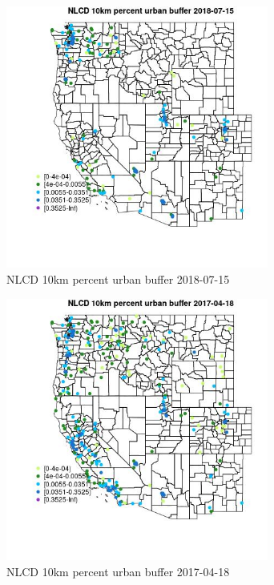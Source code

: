 \begin{figure} 
\centering  
\includegraphics[width=0.77\textwidth]{Code_Outputs/Report_ML_input_PM25_Step4_part_e_de_duplicated_aves_compiled_2019-05-21wNAs_MapObsNLCD_10km_percent_urban_buffer2018-07-15.jpg} 
\caption{\label{fig:Report_ML_input_PM25_Step4_part_e_de_duplicated_aves_compiled_2019-05-21wNAsMapObsNLCD_10km_percent_urban_buffer2018-07-15}NLCD 10km percent urban buffer 2018-07-15} 
\end{figure} 
 

\clearpage 

\begin{figure} 
\centering  
\includegraphics[width=0.77\textwidth]{Code_Outputs/Report_ML_input_PM25_Step4_part_e_de_duplicated_aves_compiled_2019-05-21wNAs_MapObsNLCD_10km_percent_urban_buffer2017-04-18.jpg} 
\caption{\label{fig:Report_ML_input_PM25_Step4_part_e_de_duplicated_aves_compiled_2019-05-21wNAsMapObsNLCD_10km_percent_urban_buffer2017-04-18}NLCD 10km percent urban buffer 2017-04-18} 
\end{figure} 
 

